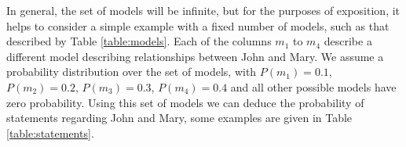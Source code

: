 \documentclass[11pt]{article}
\theoremstyle{definition}
\begin{document}


In general, the set of models will be infinite, but for the purposes
of exposition, it helps to consider a simple example with a fixed
number of models, such as that described by Table
\ref{table:models}. Each of the columns $m_1$ to $m_4$ describe a
different model describing relationships between John and Mary.  We
assume a probability distribution over the set of models, with $P(m_1)
= 0.1$, $P(m_2) = 0.2$, $P(m_3) = 0.3$, $P(m_4) = 0.4$ and all other
possible models have zero probability. Using this set of models we can
deduce the probability of statements regarding John and Mary, some
examples are given in Table \ref{table:statements}.

\end{document}
